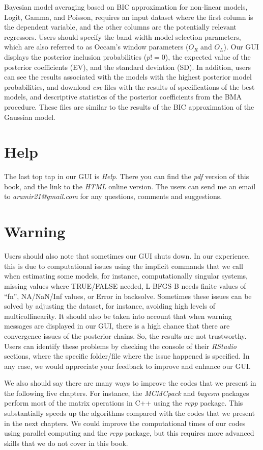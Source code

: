 Bayesian model averaging based on BIC approximation for non-linear models, Logit, Gamma, and Poisson, requires an input dataset where the first column is the dependent variable, and the other columns are the potentially relevant regressors. Users should specify the band width model selection parameters, which are also referred to as Occam's window parameters ($O_R$ and $O_L$). Our GUI displays the posterior inclusion probabilities ($p!=0$), the expected value of the posterior coefficients (EV), and the standard deviation (SD). In addition, users can see the results associated with the models with the highest posterior model probabilities, and download \textit{csv} files with the results of specifications of the best models, and descriptive statistics of the posterior coefficients from the BMA procedure. These files are similar to the results of the BIC approximation of the Gaussian model.

\section{Help}\label{secGUI7}

The last top tap in our GUI is \textit{Help}. There you can find the \textit{pdf} version of this book, and the link to the \textit{HTML} online version. The users can send me an email to \textit{aramir21@gmail.com} for any questions, comments and suggestions. 

\section{Warning}\label{secGUI8}

Users should also note that sometimes our GUI shuts down. In our experience, this is due to computational issues using the implicit commands that we call when estimating some models, for instance, computationally singular systems, missing values where TRUE/FALSE needed, L-BFGS-B needs finite values of ``fn'', NA/NaN/Inf values, or Error in backsolve. Sometimes these issues can be solved by adjusting the dataset, for instance, avoiding high levels of multicollinearity. It should also be taken into account that when warning messages are displayed in our GUI, there is a high chance that there are convergence issues of the posterior chains. So, the results are not trustworthy. Users can identify these problems by checking the console of their \textit{RStudio} sections, where the specific folder/file where the issue happened is specified. In any case, we would appreciate your feedback to improve and enhance our GUI.

We also should say there are many ways to improve the codes that we present in the following five chapters. For instance, the \textit{MCMCpack} and \textit{bayesm} packages perform most of the matrix operations in C++ using the \textit{rcpp} package. This substantially speeds up the algorithms compared with the codes that we present in the next chapters. We could improve the computational times of our codes using parallel computing and the \textit{rcpp} package, but this requires more advanced skills that we do not cover in this book.
